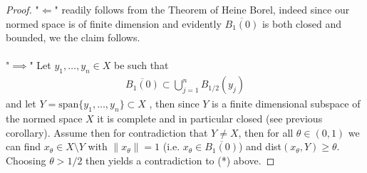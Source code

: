 \documentclass[11pt,a4paper]{article}
\theoremstyle{definition}
\begin{document}
\begin{proof}
"$\Longleftarrow$" readily follows from the Theorem of Heine Borel, indeed since our normed space is of finite dimension and evidently $\overline{B_1(0)}$ is both closed and bounded, we the claim follows. 
\\\\
"$\implies$" Let $y_1, \dots , y_n \in X$ be such that 
\begin{align*}
\overline{B_1(0)} \subset \bigcup_{j=1}^n B_{1/2}(y_j) \tag{*}
\end{align*}
and let $Y= \text{span} \{ y_1, \dots , y_n \rbrace \subset X$ , then since $Y$ is a finite dimensional subspace of the normed space $X$ it is complete and in particular closed (see previous corollary). Assume then for contradiction that $Y \neq X$, then for all $\theta \in (0,1)$ we can find $x_\theta \in X \setminus Y$ with $\|x_\theta\| =1$ (i.e. $x_\theta \in \overline{B_1(0)}$) and dist$(x_\theta, Y) \geq \theta$. Choosing $\theta > 1/2$ then yields a contradiction to (*) above. 
\end{proof}
\end{document}
